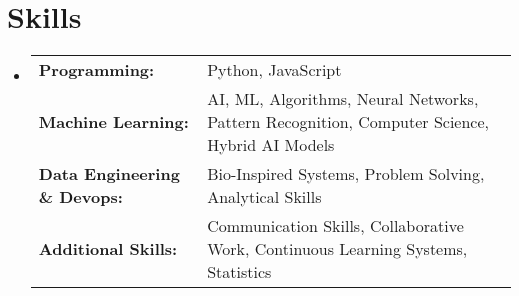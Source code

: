 

\section{Skills}
\begin{itemize}[leftmargin=0.15in, label={}]
  \item \small{
  \begin{tabularx}{\linewidth}{@{} l X @{}}
  \textbf{Programming:} & Python, JavaScript \\
  \textbf{Machine Learning:} & AI, ML, Algorithms, Neural Networks, Pattern Recognition, Computer Science, Hybrid AI Models \\
  \textbf{Data Engineering \& Devops:} & Bio-Inspired Systems, Problem Solving, Analytical Skills \\
  \textbf{Additional Skills:} & Communication Skills, Collaborative Work, Continuous Learning Systems, Statistics
  \end{tabularx}
  }
\end{itemize}
